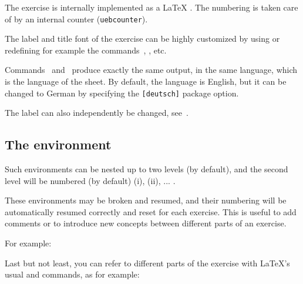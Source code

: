 \documentclass[11pt,a4paper]{article}
\begin{document}
The exercise is internally implemented as a \LaTeX{} . The numbering is
taken care of by an internal counter (\texttt{uebcounter}).

The label and title font of the exercise can be highly customized by using or redefining
for example the commands~, ,
 etc.


\begin{pkgnotice}
  Commands~ and~ produce exactly the same output, in
  the same language, which is the language of the sheet. By default, the language is
  English, but it can be changed to German by specifying the \texttt{[deutsch]} package
  option.

  The label can also independently be changed, see~.
\end{pkgnotice}



\subsection{The  environment}


Such  environments can be nested up to two levels (by default), and
the second level will be numbered (by default) (i), (ii), ... .

These environments may be broken and resumed, and their numbering will be automatically
resumed correctly and reset for each exercise. This is useful to add comments or to
introduce new concepts between different parts of an exercise.

For example:
\begin{pkgverbatim}
%
\end{pkgverbatim}

Last but not least, you can refer to different parts of the exercise with \LaTeX's usual
 and 
commands, as for example:
\begin{pkgverbatim}
%
\end{pkgverbatim}
\end{document}
